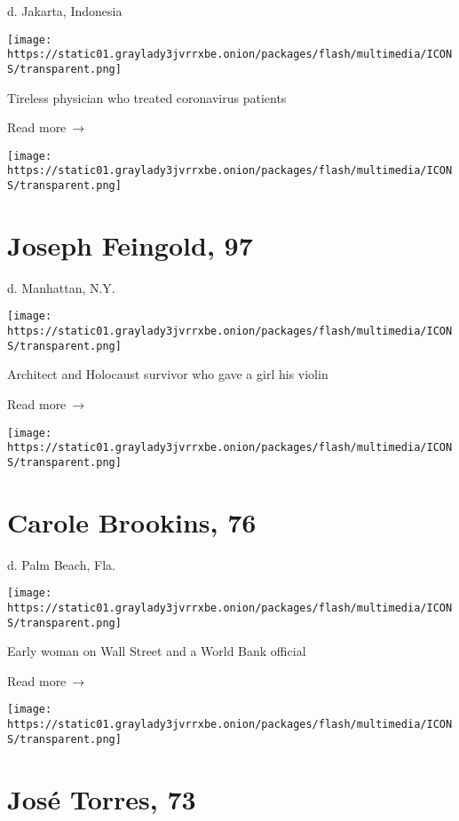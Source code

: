 d. Jakarta, Indonesia

\texttt{[image: https://static01.graylady3jvrrxbe.onion/packages/flash/multimedia/ICONS/transparent.png]}

Tireless physician who treated coronavirus patients

 Read more~→

\href{https://www.nytimes3xbfgragh.onion/2020/04/22/obituaries/joseph-feingold-dead-coronavirus.html}{}

\texttt{[image: https://static01.graylady3jvrrxbe.onion/packages/flash/multimedia/ICONS/transparent.png]}

\hypertarget{joseph-feingold-97}{%
\section{Joseph Feingold, 97}\label{joseph-feingold-97}}

d. Manhattan, N.Y.

\texttt{[image: https://static01.graylady3jvrrxbe.onion/packages/flash/multimedia/ICONS/transparent.png]}

Architect and Holocaust survivor who gave a girl his violin

 Read more~→

\href{https://www.nytimes3xbfgragh.onion/2020/04/22/obituaries/carole-brookins-dead-coronavirus.html}{}

\texttt{[image: https://static01.graylady3jvrrxbe.onion/packages/flash/multimedia/ICONS/transparent.png]}

\hypertarget{carole-brookins-76}{%
\section{Carole Brookins, 76}\label{carole-brookins-76}}

d. Palm Beach, Fla.

\texttt{[image: https://static01.graylady3jvrrxbe.onion/packages/flash/multimedia/ICONS/transparent.png]}

Early woman on Wall Street and a World Bank official

 Read more~→

\href{https://www.nytimes3xbfgragh.onion/2020/04/22/nyregion/jose-torres-dead-coronavirus.html}{}

\texttt{[image: https://static01.graylady3jvrrxbe.onion/packages/flash/multimedia/ICONS/transparent.png]}

\hypertarget{josuxe9-torres-73}{%
\section{José Torres, 73}\label{josuxe9-torres-73}}

